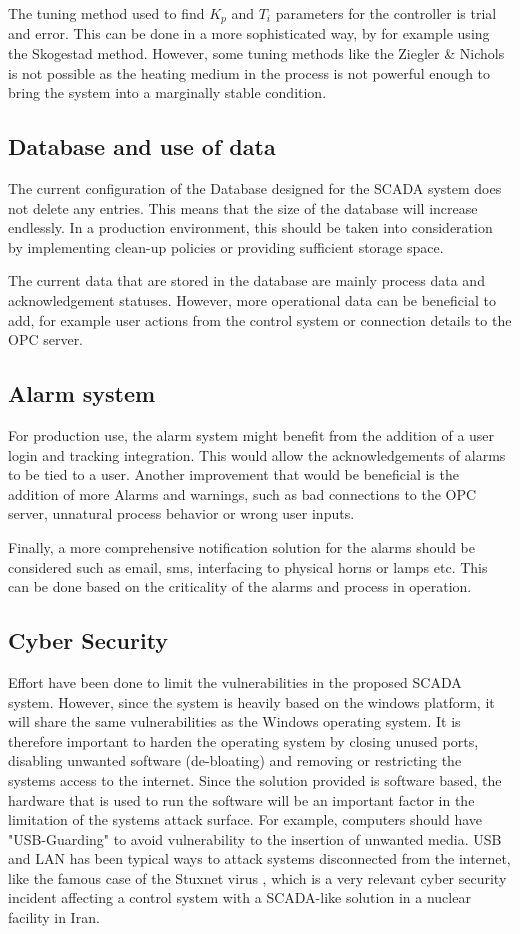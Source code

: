 \documentclass[conference]{IEEEtran}
\begin{document}
The tuning method used to find $K_p$ and $T_i$ parameters for the controller is trial and error. This can be done in a more sophisticated way, by for example using the Skogestad method. However, some tuning methods like the Ziegler \& Nichols is not possible as the heating medium in the process is not powerful enough to bring the system into a marginally stable condition.

\subsection{Database and use of data}
The current configuration of the Database designed for the SCADA system does not delete any entries. This means that the size of the database will increase endlessly. In a production environment, this should be taken into consideration by implementing clean-up policies or providing sufficient storage space.

The current data that are stored in the database are mainly process data and acknowledgement statuses. However, more operational data can be beneficial to add, for example user actions from the control system or connection details to the OPC server.

\subsection{Alarm system}
For production use, the alarm system might benefit from the addition of a user login and tracking integration. This would allow the acknowledgements of alarms to be tied to a user. Another improvement that would be beneficial is the addition of more Alarms and warnings, such as bad connections to the OPC server, unnatural process behavior or wrong user inputs.

Finally, a more comprehensive notification solution for the alarms should be considered such as email, sms, interfacing to physical horns or lamps etc. This can be done based on the criticality of the alarms and process in operation.

\subsection{Cyber Security}
Effort have been done to limit the vulnerabilities in the proposed SCADA system. However, since the system is heavily based on the windows platform, it will share the same vulnerabilities as the Windows operating system. It is therefore important to harden the operating system by closing unused ports, disabling unwanted software (de-bloating) and removing or restricting the systems access to the internet. Since the solution provided is software based, the hardware that is used to run the software will be an important factor in the limitation of the systems attack surface. For example, computers should have "USB-Guarding" to avoid vulnerability to the insertion of unwanted media. USB and LAN has been typical ways to attack systems disconnected from the internet, like the famous case of the Stuxnet virus \cite{mims_2017}, which is a very relevant cyber security incident affecting a control system with a SCADA-like solution in a nuclear facility in Iran.
\end{document}
